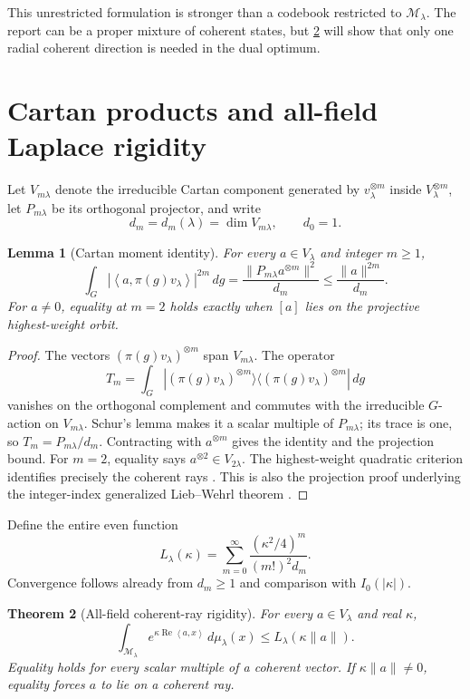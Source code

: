 \documentclass[11pt,a4paper]{article}
\newtheorem{theorem}{Theorem}[section]
\newtheorem{lemma}[theorem]{Lemma}
\newcommand{\M}{\mathcal M}
\newcommand{\ip}[2]{\left\langle #1,#2\right\rangle}
\DeclareMathOperator{\Rea}{Re}
\begin{document}
This unrestricted formulation is stronger than a codebook restricted to
$\M_\lambda$.  The report can be a proper mixture of coherent states, but
\cref{thm:laplace} will show that only one radial coherent direction is
needed in the dual optimum.

\section{Cartan products and all-field Laplace rigidity}

Let $V_{m\lambda}$ denote the irreducible Cartan component generated by
$v_\lambda^{\otimes m}$ inside $V_\lambda^{\otimes m}$, let
$P_{m\lambda}$ be its orthogonal projector, and write
\[
 d_m=d_m(\lambda)=\dim V_{m\lambda},\qquad d_0=1.
\]

\begin{lemma}[Cartan moment identity]\label{lem:cartan}
For every $a\in V_\lambda$ and integer $m\ge1$,
\[
 \int_G|\ip{a}{\pi(g)v_\lambda}|^{2m}\,dg
 =\frac{\|P_{m\lambda}a^{\otimes m}\|^2}{d_m}
 \le\frac{\|a\|^{2m}}{d_m}.
 \tag{3.1}
\]
For $a\ne0$, equality at $m=2$ holds exactly when $[a]$ lies on the
projective highest-weight orbit.
\end{lemma}

\begin{proof}
The vectors $(\pi(g)v_\lambda)^{\otimes m}$ span $V_{m\lambda}$.  The
operator
\[
 T_m=\int_G |(\pi(g)v_\lambda)^{\otimes m}\rangle
 \langle(\pi(g)v_\lambda)^{\otimes m}|\,dg
\]
vanishes on the orthogonal complement and commutes with the irreducible
$G$-action on $V_{m\lambda}$.  Schur's lemma makes it a scalar multiple of
$P_{m\lambda}$; its trace is one, so $T_m=P_{m\lambda}/d_m$.  Contracting
with $a^{\otimes m}$ gives the identity and the projection bound.  For
$m=2$, equality says $a^{\otimes2}\in V_{2\lambda}$.  The
highest-weight quadratic criterion identifies precisely the coherent rays
\cite{Lichtenstein1982}.  This is also the projection proof underlying the
integer-index generalized Lieb--Wehrl theorem \cite{Sugita2002}.
\end{proof}

Define the entire even function
\[
 L_\lambda(\kappa)=\sum_{m=0}^\infty
 \frac{(\kappa^2/4)^m}{(m!)^2d_m}.
 \tag{3.2}
\]
Convergence follows already from $d_m\ge1$ and comparison with
$I_0(|\kappa|)$.

\begin{theorem}[All-field coherent-ray rigidity]\label{thm:laplace}
For every $a\in V_\lambda$ and real $\kappa$,
\[
 \int_{\M_\lambda}
 e^{\kappa\Rea\ip{a}{x}}\,d\mu_\lambda(x)
 \le L_\lambda(\kappa\|a\|).
 \tag{3.3}
\]
Equality holds for every scalar multiple of a coherent vector.  If
$\kappa\|a\|\ne0$, equality forces $a$ to lie on a coherent ray.
\end{theorem}
\end{document}
